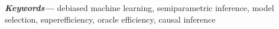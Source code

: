 \documentclass[11pt]{article}
\providecommand{\keywords}[1]
{
  \small	
  \textbf{\textit{Keywords---}} #1
}
\theoremstyle{definition}
\begin{document}
\begin{abstract}


\end{abstract}

\keywords{debiased machine learning, semiparametric inference, model selection, superefficiency, oracle efficiency, causal inference}
\end{document}
